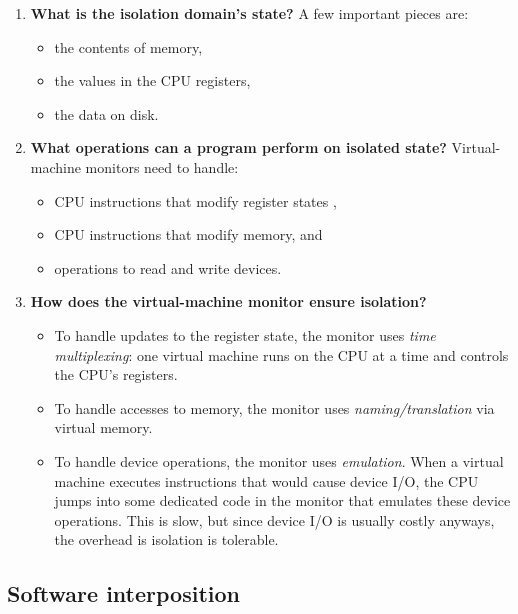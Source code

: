\begin{enumerate}
  \item \textbf{What is the isolation domain's state?}
        A few important pieces are:
        \begin{itemize}
          \item the contents of memory,
          \item the values in the CPU registers,
          \item the data on disk.
        \end{itemize}

\item \textbf{What operations can a program perform on isolated state?}
        Virtual-machine monitors need to handle: 
        \begin{itemize}
          \item CPU instructions that modify register states ,
          \item CPU instructions that modify memory, and
          \item operations to read and write devices.
        \end{itemize}


\item \textbf{How does the virtual-machine monitor ensure isolation?}
        \begin{itemize}
          \item To handle updates to the register state, the monitor
                uses \emph{time multiplexing}: one virtual machine
                runs on the CPU at a time and controls the
                CPU's registers.
          \item To handle accesses to memory, the monitor uses
                \emph{naming/translation} via virtual memory.
          \item To handle device operations, the monitor uses 
                \emph{emulation}.
                When a virtual machine executes instructions that
                would cause device I/O, the CPU jumps into some dedicated
                code in the monitor that emulates these device operations.
                This is slow, but since device I/O is usually costly
                anyways, the overhead is isolation is tolerable.
        \end{itemize}
  
\end{enumerate}


\subsection{Software interposition}

